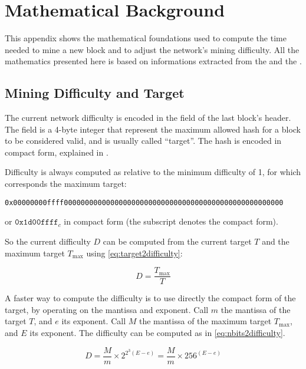 \chapter{Mathematical Background}\label{appendix:math}

This appendix shows the mathematical foundations used to compute the time
needed to mine a new block and to adjust the network's mining difficulty. All
the mathematics presented here is based on informations extracted from the
 \cite{bitcoin-dev} and the
 \cite{btcwiki-difficulty}.

\section{Mining Difficulty and Target}\label{appendix:difficulty-target}

The current network difficulty is encoded in the  field of the last
block's header. The field is a 4-byte integer that represent the maximum
allowed hash for a block to be considered valid, and is usually called
``target''. The hash is encoded in compact form, explained in
.

Difficulty is always computed as relative to the minimum difficulty of 1, for
which corresponds the maximum target:
\begin{verbatim}
0x00000000ffff0000000000000000000000000000000000000000000000000000
\end{verbatim}
or \(\texttt{0x1d00ffff}_{c}\) in compact form (the subscript  denotes
the compact form).

So the current difficulty \(D\) can be computed from the current target \(T\)
and the maximum target \(T_{\text{max}}\) using \eqref{eq:target2difficulty}:

\begin{equation}\label{eq:target2difficulty}
	D = \frac{T_{\text{max}}}{T}
\end{equation}

A faster way to compute the difficulty is to use directly the compact form of
the target, by operating on the mantissa and exponent. Call \(m\) the mantissa
of the target \(T\), and \(e\) its exponent. Call \(M\) the mantissa of the
maximum target \(T_{\text{max}}\), and \(E\) its exponent. The difficulty can
be computed as in \eqref{eq:nbits2difficulty}.

\begin{equation}\label{eq:nbits2difficulty}
	D = \frac{M}{m} \times 2^{2^{3}(E - e)} = \frac{M}{m} \times 256^{(E -
	e)}
\end{equation}

